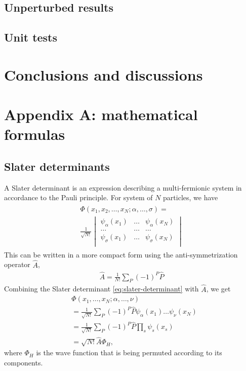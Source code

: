\documentclass[11pt,twocolumn]{article}
\begin{document}
\subsection{Unperturbed results}
\subsection{Unit tests}

\section{Conclusions and discussions}

\section{Appendix A: mathematical formulas}
\subsection{Slater determinants}
A Slater determinant is an expression describing a multi-fermionic system in accordance to the Pauli principle. For system of $N$ particles, we have 
\begin{align}
	\begin{split}
		\Phi(x_1,x_2,\dots,x_N; \alpha,\dots,\sigma) =\\
		\frac{1}{\sqrt{N!}}
		\begin{vmatrix}
			\psi_\alpha(x_1) & \dots & \psi_\alpha(x_N) \\
			\dots & \dots & \dots \\
			\psi_\sigma(x_1) & \dots & \psi_\sigma(x_N) \\
		\end{vmatrix}
	\end{split}
	\label{eq:slater-determinant}
\end{align}
This can be written in a more compact form using the anti-symmetrization operator $\hat{A}$,
\begin{align}
	\hat{A} = \frac{1}{N!}\sum_P (-1)^P \hat{P}
	\label{eq:anti-symmetrization-operator}
\end{align}
Combining the Slater determinant \eqref{eq:slater-determinant} with $\hat{A}$, we get
\begin{align}
	&\Phi(x_1,\dots,x_N;\alpha,\dots,\nu) \nonumber \\
	&= \frac{1}{\sqrt{N!}}\sum_P (-1)^P \hat{P}\psi_\alpha(x_1)\dots\psi_\nu(x_N) \nonumber \\
	&= \frac{1}{\sqrt{N!}}\sum_P (-1)^P \hat{P} \prod_s \psi_s(x_s) \nonumber \\
	&= \sqrt{N!}\hat{A}\Phi_H,
	\label{eq:slater-determinant-compact}
\end{align}
where $\Phi_H$ is the wave function that is being permuted according to its components.
\end{document}
